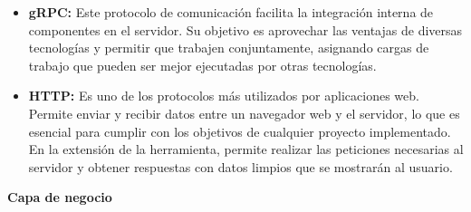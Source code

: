 \begin{itemize}
	\item \textbf{gRPC:} Este protocolo de comunicación facilita la integración interna de componentes en el servidor. Su objetivo es aprovechar las ventajas de diversas tecnologías y permitir que trabajen conjuntamente, asignando cargas de trabajo que pueden ser mejor ejecutadas por otras tecnologías.
	
	\item \textbf{HTTP:} Es uno de los protocolos más utilizados por aplicaciones web. Permite enviar y recibir datos entre un navegador web y el servidor, lo que es esencial para cumplir con los objetivos de cualquier proyecto implementado. En la extensión de la herramienta, permite realizar las peticiones necesarias al servidor y obtener respuestas con datos limpios que se mostrarán al usuario.
	
\end{itemize}

\textbf{Capa de negocio}

